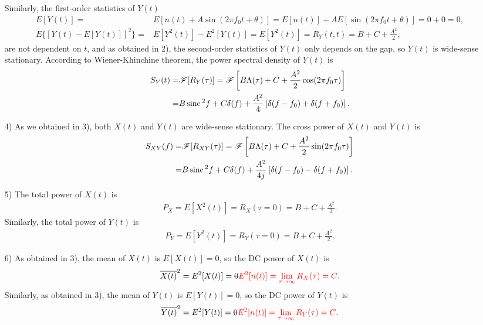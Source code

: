 \documentclass{assignment}
\begin{document}
\begin{sol}
\begin{itemize}
        Similarly, the first-order statistics of $Y(t)$
        \begin{align}
            E[Y(t)]=&E[n(t)+A\sin(2\pi f_0t+\theta)]=E[n(t)]+AE[\sin(2\pi f_0t+\theta)]=0+0=0,\\
            E\{[Y(t)-E[Y(t)]]^2\}=&E[Y^2(t)]-E^2[Y(t)]=E[Y^2(t)]=R_Y(t,t)=B+C+\frac{A^2}{2},
        \end{align}
        are not dependent on $t$, and as obtained in 2), the second-order statistics of $Y(t)$ only depends on the gap, so $Y(t)$ is wide-sense stationary. According to Wiener-Khinchine theorem, the power spectral density of $Y(t)$ is
        \begin{align}
            \notag S_Y(t)=&\mathscr{F}[R_Y(\tau)]=\mathscr{F}\left[B\Lambda(\tau)+C+\frac{A^2}{2}\cos(2\pi f_0\tau)\right]\\
            =&B\,\text{sinc}\,^2f+C\delta(f)+\frac{A^2}{4}\left[\delta(f-f_0)+\delta(f+f_0)\right].
        \end{align}
        \item[4)] As we obtained in 3), both $X(t)$ and $Y(t)$ are wide-sense stationary. The cross power of $X(t)$ and $Y(t)$ is
        \begin{align}
            \notag S_{XY}(f)=&\mathscr{F}[R_{XY}(\tau)]=\mathscr{F}\left[B\Lambda(\tau)+C+\frac{A^2}{2}\sin(2\pi f_0\tau)\right]\\
            =&B\,\text{sinc}\,^2f+C\delta(f)+\frac{A^2}{4j}\left[\delta(f-f_0)-\delta(f+f_0)\right].
        \end{align}
        \item[5)] The total power of $X(t)$ is
        \begin{align}
            P_X=E[X^2(t)]=R_X(\tau=0)=B+C+\frac{A^2}{2}.
        \end{align}
        Similarly, the total power of $Y(t)$ is
        \begin{align}
            P_Y=E[Y^2(t)]=R_Y(\tau=0)=B+C+\frac{A^2}{2}.
        \end{align}
        \item[6)] As obtained in 3), the mean of $X(t)$ is $E[X(t)]=0$, so the DC power of $X(t)$ is
        \begin{align}
            \overline{X(t)}^2=E^2[X(t)]=\text{\sout{$0$}}{\color{red}E^2[n(t)]=\lim_{\tau\rightarrow\infty}R_X(\tau)=C}.
        \end{align}
        Similarly, as obtained in 3), the mean of $Y(t)$ is $E[Y(t)]=0$, so the DC power of $Y(t)$ is
        \begin{align}
            \overline{Y(t)}^2=E^2[Y(t)]=\text{\sout{$0$}}{\color{red}E^2[n(t)]=\lim_{\tau\rightarrow\infty}R_Y(\tau)=C}.
        \end{align}
    \end{itemize}
\end{sol}
\end{document}
